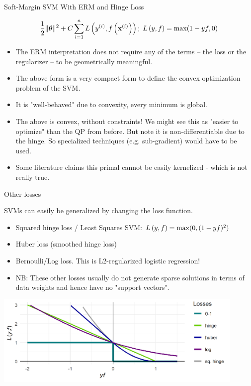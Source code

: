 \documentclass[11pt,compress,t,notes=noshow, xcolor=table]{beamer}
\begin{document}
\begin{vbframe}{Soft-Margin SVM With ERM and Hinge Loss}
\framebreak

  $$ \frac{1}{2} \|\bm{\theta}\|^2 + C \sum\limits_{i=1}^n L\left(y^{(i)}, f\left(\mathbf{x}^{(i)}\right)\right) ;\; L\left(y, f\right) = \max(1-yf, 0)$$
\begin{itemize}
 \item  The ERM interpretation does not require any of the terms -- the loss or the regularizer -- to be geometrically meaningful.
  \item The above form is a very compact form to define the convex optimization problem of the SVM. 
  \item It is "well-behaved" due to convexity, every minimum is global.
  \item The above is convex, without constraints! We might see this as "easier to optimize" than the QP from before. But note it is non-differentiable due to the hinge. 
    So specialized techniques (e.g. sub-gradient) would have to be used. 
  \item Some literature claims this primal cannot be easily kernelized - which is not really true.
  \end{itemize}
\end{vbframe}

\begin{vbframe}{Other losses}

  SVMs can easily be generalized by changing the loss function.
  \begin{itemize}
    \item Squared hinge loss / Least Squares SVM: $L\left(y, f\right) = \max(0, (1 - yf)^2)$ 
    \item Huber loss (smoothed hinge loss)
    \item Bernoulli/Log loss. This is L2-regularized logistic regression!
    \item NB: These other losses usually do not generate sparse solutions in terms of 
      data weights and hence have no "support vectors".
  \end{itemize}


\begin{center}
\includegraphics[width = 0.9\textwidth]{figure/other_losses.png} \\
\end{center}


\end{vbframe}


\endlecture
\end{document}
